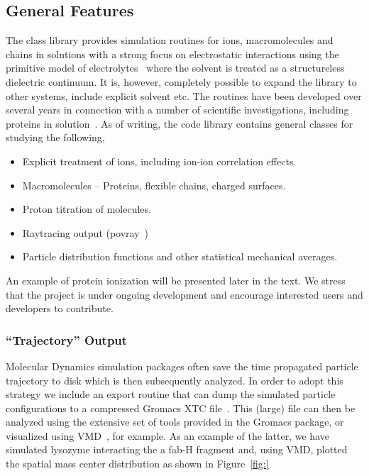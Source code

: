 \documentclass[10pt]{bmc_article}
\newenvironment{bmcformat}{\fussy\setboolean{publ}{true}}{\fussy}
\begin{document}
\begin{bmcformat}
\subsection*{General Features}
The class library provides simulation routines for ions, macromolecules and chains in solutions with a strong focus on electrostatic interactions using the primitive model of electrolytes~\cite{hill:86} where the solvent is treated as a structureless dielectric continuum. It is, however, completely possible to expand the library to other systems, include explicit solvent etc. The routines have been developed over several years in connection with a number of scientific investigations, including proteins in solution~\cite{lund:05}.
As of writing, the code library contains general classes for studying the following,
\begin{itemize}
\item Explicit treatment of ions, including ion-ion correlation effects.
\item Macromolecules -- Proteins, flexible chains, charged surfaces.
\item Proton titration of molecules.
\item Raytracing output (povray~\cite{povray})
\item Particle distribution functions and other statistical mechanical averages.
\end{itemize}
An example of protein ionization will be presented later in the text.
We stress that the project is under ongoing development and encourage interested users and developers to contribute.

\subsubsection*{``Trajectory'' Output}
Molecular Dynamics simulation packages often save the time propagated particle trajectory to disk which is then subsequently analyzed.
In order to adopt this strategy we include an export routine that can dump the simulated particle configurations to a compressed Gromacs XTC file~\cite{gromacs}.
This (large) file can then be analyzed using the extensive set of tools provided in the Gromacs package, or visualized using VMD~\cite{vmd}, for example.
As an example of the latter, we have simulated lysozyme interacting the a fab-H fragment and, using VMD, plotted the spatial mass center distribution as shown in Figure~\ref{fig:}


 



\end{bmcformat}
\end{document}
